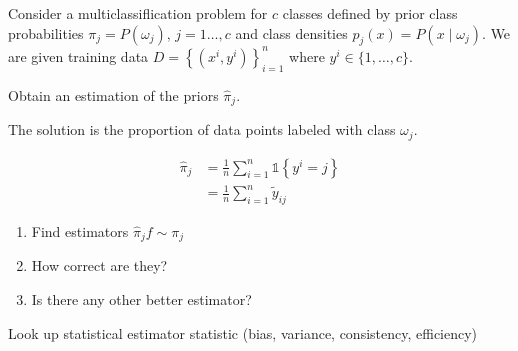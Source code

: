 \begin{exercise}{}{} Consider a multiclassiflication problem for
$c$ classes defined by prior class probabilities
$\pi_j = P(\omega_j),\, j=1\dots, c$ and class densities
$p_j(x) = P(x\mid \omega_j)$. We are given training data
$D = \left\{ (x^i, y^i) \right\}_{i=1}^n$ where $y^i \in \{1, \dots, c\}$.

Obtain an estimation of the priors $\hat\pi_j$.


The solution is the proportion of data points labeled with class $\omega_j$.

\tcblower

\begin{align*}
  \hat\pi_j &= \frac{1}{n} \sum_{i=1}^n \mathds{1}\left\{ y^i = j \right\} \\
  &= \frac{1}{n} \sum_{i=1}^n \tilde{y}_{ij}
\end{align*}

\end{exercise}

\begin{exercise}{}{}
\begin{enumerate}
  \item Find estimators $\hat\pi_j f\sim\pi_j$
  \item How correct are they?
  \item Is there any other better estimator?
\end{enumerate}

\begin{hint}
  Look up statistical estimator statistic (bias, variance, consistency, efficiency)
\end{hint}
\end{exercise}

